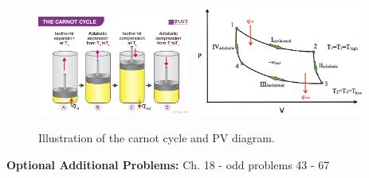 \documentclass[11pt]{article}
\begin{document}
\begin{figure}[hbpt]
  \includegraphics[width=0.45\textwidth]{carnot.png}
  \includegraphics[width=0.5\textwidth]{pv_carnot.png}
  \caption{Illustration of the carnot cycle and PV diagram.}
  \label{fig:carnot}
\end{figure}

%
%
%


%
%
%
%
%
%
%


\vfill
\textbf{Optional Additional Problems:} Ch. 18 - odd problems 43 - 67
\end{document}
